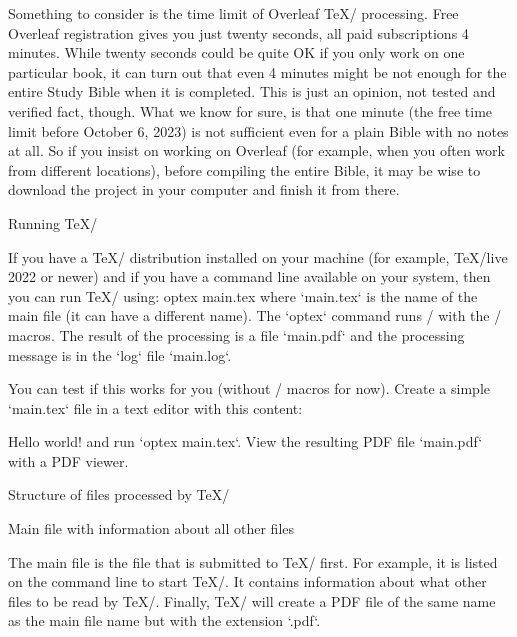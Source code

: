 \recommended
Something to consider is the time limit of Overleaf \TeX/ processing. 
Free Overleaf registration gives you just twenty seconds, 
all paid  subscriptions 4 minutes. 
While twenty seconds could be quite OK if you only work on one particular book, 
it can turn out that even 4 minutes might be not enough for the entire Study Bible 
when it is completed. 
This is just an opinion, not tested and verified fact, though. 
What we know for sure, is that one minute (the free time limit before October 6, 2023) 
is not sufficient even for a plain Bible with no notes at all.
So if you insist on working on Overleaf 
(for example, when you often  work from different locations), 
before compiling the entire Bible, it may be wise to download the project in your 
computer and finish it from there.






\sec Running \TeX/

If you have a \TeX/ distribution installed on your machine (for example, \TeX/live
2022 or newer) %
and if you have a command line available on your system, then you can run \TeX/ using:
\begtt
optex main.tex
\endtt
where `main.tex` is the name of the main file (it can have a different name). 
The `optex` command runs \LuaTeX/ with the \OpTeX/ macros. The result of the processing is a file 
`main.pdf` and the processing message is in the `log` file `main.log`.

You can test if this works for you (without \OpBible/ macros for now). Create a simple `main.tex` 
file in a text editor with this content:

\begtt
\fontfam[lm]
Hello world!
\bye
\endtt
and run `optex main.tex`. View the resulting PDF file `main.pdf` with a PDF viewer.


\sec Structure of files processed by \TeX/

\secc[main] Main file with information about all other files

The main file is the file that is submitted to \TeX/ first. For example, it is
listed on the command line to start \TeX/. It contains information about what
other files to be read by \TeX/. Finally, \TeX/ will create a PDF file of the same
name as the main file name but with the extension `.pdf`.

